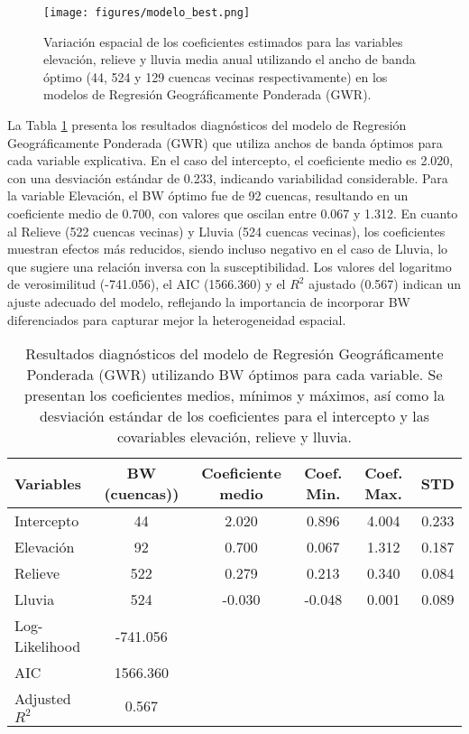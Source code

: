 \documentclass[
  manuscript=article,  
  layout=preprint,  
]{format}
\begin{document}
\begin{figure}[ht!]
    \centering
      {\texttt{[image: figures/modelo\_best.png]}}
\caption{Variación espacial de los coeficientes estimados para las variables elevación, relieve y lluvia media anual utilizando el ancho de banda óptimo (44, 524 y 129 cuencas vecinas respectivamente) en los modelos de Regresión Geográficamente Ponderada (GWR).}
    \label{fig:modelo_best}
\end{figure}

La Tabla \ref{tab:optimo} presenta los resultados diagnósticos del modelo de Regresión Geográficamente Ponderada (GWR) que utiliza anchos de banda óptimos para cada variable explicativa. En el caso del intercepto, el coeficiente medio es 2.020, con una desviación estándar de 0.233, indicando variabilidad considerable. Para la variable Elevación, el BW óptimo fue de 92 cuencas, resultando en un coeficiente medio de 0.700, con valores que oscilan entre 0.067 y 1.312. En cuanto al Relieve (522 cuencas vecinas) y Lluvia (524 cuencas vecinas), los coeficientes muestran efectos más reducidos, siendo incluso negativo en el caso de Lluvia, lo que sugiere una relación inversa con la susceptibilidad. Los valores del logaritmo de verosimilitud (-741.056), el AIC (1566.360) y el $R^2$ ajustado (0.567) indican un ajuste adecuado del modelo, reflejando la importancia de incorporar BW diferenciados para capturar mejor la heterogeneidad espacial.

\begin{table}[htbp]
    \centering
    \caption{Resultados diagnósticos del modelo de Regresión Geográficamente Ponderada (GWR) utilizando BW óptimos para cada variable. Se presentan los coeficientes medios, mínimos y máximos, así como la desviación estándar de los coeficientes para el intercepto y las covariables elevación, relieve y lluvia.}
    \label{tab:optimo}
    \begin{tabular}{lccccc}
        \toprule
        Variables & BW (cuencas)) & Coeficiente medio & Coef. Min. & Coef. Max. & STD \\
        \midrule
        Intercepto & 44 & 2.020 & 0.896 & 4.004 & 0.233 \\
        Elevación & 92 & 0.700 & 0.067 & 1.312 & 0.187 \\
        Relieve & 522 & 0.279 & 0.213 & 0.340 & 0.084 \\
        Lluvia & 524 & -0.030 & -0.048 & 0.001 & 0.089 \\
        \midrule
        Log-Likelihood & -741.056 &  &  &  &  \\
        AIC & 1566.360 &  &  &  &  \\
        Adjusted $R^2$ & 0.567 &  &  &  &  \\
        \bottomrule
    \end{tabular}
\end{table}
\end{document}

